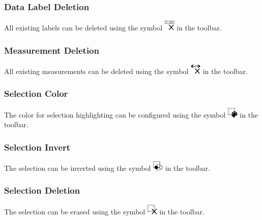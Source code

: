 \subsubsection{Data Label Deletion}

All existing labels can be deleted using the symbol \includegraphics[width=0.5cm,frame]{../../data/icons/label_delete.png} in the toolbar.

\subsubsection{Measurement Deletion}

All existing measurements can be deleted using the symbol \includegraphics[width=0.5cm,frame]{../../data/icons/measurement_delete.png} in the toolbar.

\subsubsection{Selection Color}

The color for selection highlighting can be configured using the symbol \includegraphics[width=0.5cm,frame]{../../data/icons/select_color.png} in the toolbar.

\subsubsection{Selection Invert}

The selection can be inverted using the symbol \includegraphics[width=0.5cm,frame]{../../data/icons/select_invert.png} in the toolbar.

\subsubsection{Selection Deletion}

The selection can be erased using the symbol \includegraphics[width=0.5cm,frame]{../../data/icons/select_delete.png} in the toolbar.


